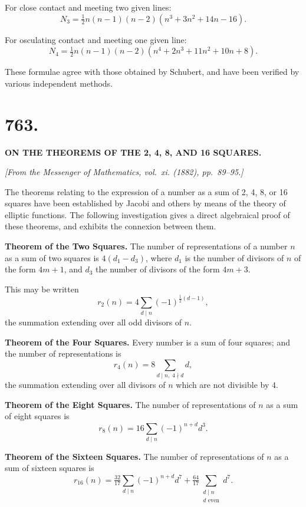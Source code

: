 \documentclass[11pt,a4paper]{book}
\begin{document}
For close contact and meeting two given lines:
%
\[
N_3 = \tfrac{1}{2} n(n-1)(n-2)(n^3 + 3n^2 + 14n - 16).
\]

For osculating contact and meeting one given line:
%
\[
N_4 = \tfrac{1}{2} n(n-1)(n-2)(n^4 + 2n^3 + 11n^2 + 10n + 8).
\]

These formulae agree with those obtained by Schubert, and have been
verified by various independent methods.

\newpage


\section*{763.}

\begin{center}
\textbf{ON THE THEOREMS OF THE 2, 4, 8, AND 16 SQUARES.}
\end{center}

\begin{flushright}
\textit{[From the Messenger of Mathematics, vol.~xi. (1882), pp.~89--95.]}
\end{flushright}

The theorems relating to the expression of a number as a sum of 2, 4, 8,
or 16 squares have been established by Jacobi and others by means of
the theory of elliptic functions. The following investigation gives a direct
algebraical proof of these theorems, and exhibits the connexion between
them.

\textbf{Theorem of the Two Squares.} The number of representations of a number
$n$ as a sum of two squares is $4(d_1 - d_3)$, where $d_1$ is the number of divisors
of $n$ of the form $4m+1$, and $d_3$ the number of divisors of the form $4m+3$.

This may be written
%
\[
r_2(n) = 4 \sum_{d \mid n} (-1)^{\frac{1}{2}(d-1)},
\]
%
the summation extending over all odd divisors of $n$.

\textbf{Theorem of the Four Squares.} Every number is a sum of four squares;
and the number of representations is
%
\[
r_4(n) = 8 \sum_{d \mid n,\; 4 \nmid d} d,
\]
%
the summation extending over all divisors of $n$ which are not divisible
by $4$.

\textbf{Theorem of the Eight Squares.} The number of representations of $n$ as
a sum of eight squares is
%
\[
r_8(n) = 16 \sum_{d \mid n} (-1)^{n+d} d^3.
\]

\textbf{Theorem of the Sixteen Squares.} The number of representations of $n$ as
a sum of sixteen squares is
%
\[
r_{16}(n) = \tfrac{32}{17} \sum_{d \mid n} (-1)^{n+d} d^7
+ \tfrac{64}{17} \sum_{\substack{d \mid n \\ d \text{ even}}} d^7.
\]
\end{document}
